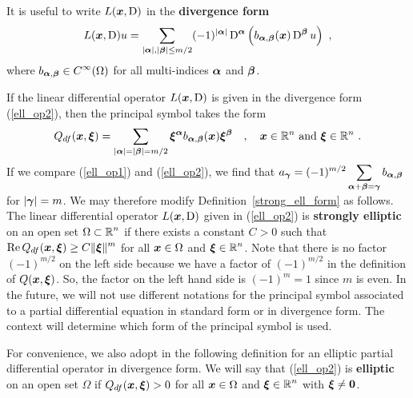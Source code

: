It is useful to write $L({\bm{x}},\operatorname{D})$ in the {\bfseries divergence form}%
\begin{equation} \label{ell_op2}
L({\bm{x}},\operatorname{D})u = \sum_{|{\bm{\alpha}}|,|{\bm{\beta}}|\leq m/2}
(-1)^{|{\bm{\alpha}}|} \operatorname{D}^{{\bm{\alpha}}}
\left( b_{{\bm{\alpha}},{\bm{\beta}}}({\bm{x}}) \operatorname{D}^{{\bm{\beta}}} u\right) \ ,
\end{equation}
where $\displaystyle b_{{\bm{\alpha}},{\bm{\beta}}} \in C^\infty(\Omega)$ for all
multi-indices ${\bm{\alpha}}$ and ${\bm{\beta}}$.

If the linear differential operator $L({\bm{x}},\operatorname{D})$ is given in the
divergence form (\ref{ell_op2}), then the principal symbol takes the
form
\[
Q_{df}({\bm{x}}, {\bm{\xi}}) = \sum_{|{\bm{\alpha}}|=|{\bm{\beta}}|=m/2}
{\bm{\xi}}^{{\bm{\alpha}}}
b_{{\bm{\alpha}},{\bm{\beta}}}({\bm{x}}) {\bm{\xi}}^{{\bm{\beta}}} \quad ,
\quad {\bm{x}} \in \mathbb{R}^n \ \text{and} \ {\bm{\xi}} \in \mathbb{R}^n \ .
\]
If we compare (\ref{ell_op1}) and (\ref{ell_op2}), we find that
$\displaystyle a_{{\bm{\gamma}}} = (-1)^{m/2}
\sum_{{\bm{\alpha}}+{\bm{\beta}}={\bm{\gamma}}} b_{{\bm{\alpha}},{\bm{\beta}}}$
for $|{\bm{\gamma}}|= m$.
We may therefore modify Definition~\ref{strong_ell_form} as
follows.  The linear differential operator $L({\bm{x}},\operatorname{D})$ given in
(\ref{ell_op2}) is {\bfseries strongly elliptic}
on an open set $\displaystyle \Omega \subset \mathbb{R}^n$ if there exists a
constant $C>0$ such that
$\displaystyle \operatorname{Re} Q_{df}({\bm{x}}, {\bm{\xi}}) \geq C \|{\bm{\xi}}\|^m$
for all ${\bm{x}} \in \Omega$ and $\displaystyle {\bm{\xi}} \in \mathbb{R}^n$.
Note that there is no factor $\displaystyle (-1)^{m/2}$ on the left
side because we have a factor of $\displaystyle (-1)^{m/2}$ in the
definition of $Q({\bm{x}},{\bm{\xi}})$.  So, the factor on the left hand side is
$\displaystyle (-1)^m =1$ since $m$ is even.
In the future, we will not use different notations for the principal
symbol associated to a partial differential equation in standard form
or in divergence form.  The context will determine which form of the
principal symbol is used.

For convenience, we also adopt in the following definition for an
elliptic partial differential operator in divergence form.  We will
say that (\ref{ell_op2}) is {\bfseries elliptic} on an
open set $\Omega$ if $Q_{df}({\bm{x}}, {\bm{\xi}}) > 0$ for all
${\bm{x}} \in \Omega$ and $\displaystyle {\bm{\xi}} \in \mathbb{R}^n$ with
${\bm{\xi}} \neq {\bm{0}}$.

